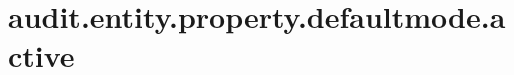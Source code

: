 \section{audit.entity.property.defaultmode.active}
\label{configuration:AuditEntityPropertyDefaultmodeActive}
\TODO
